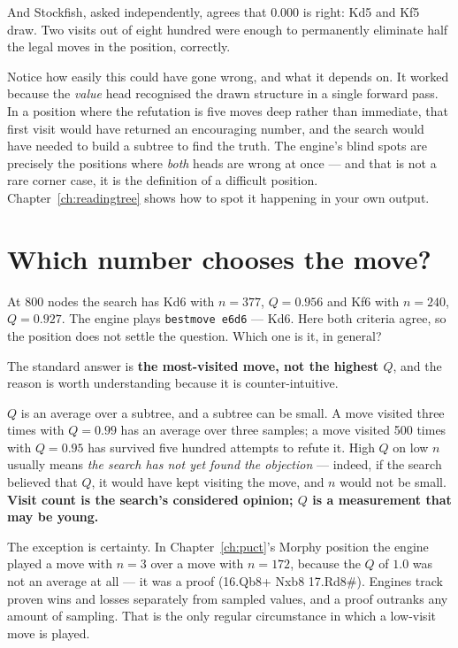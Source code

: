 And Stockfish, asked independently, agrees that $0.000$ is right: Kd5 and Kf5 draw. Two visits
out of eight hundred were enough to permanently eliminate half the legal moves in the
position, correctly.

\begin{pitfall}
Notice how easily this could have gone wrong, and what it depends on. It worked because the
\emph{value} head recognised the drawn structure in a single forward pass. In a position
where the refutation is five moves deep rather than immediate, that first visit would have
returned an encouraging number, and the search would have needed to build a subtree to find
the truth. The engine's blind spots are precisely the positions where \emph{both} heads are
wrong at once --- and that is not a rare corner case, it is the definition of a difficult
position. Chapter~\ref{ch:readingtree} shows how to spot it happening in your own output.
\end{pitfall}

\section{Which number chooses the move?}

At 800 nodes the search has Kd6 with $n=377$, $Q = 0.956$ and Kf6 with $n = 240$,
$Q = 0.927$. The engine plays \texttt{bestmove e6d6} --- Kd6. Here both criteria agree, so the
position does not settle the question. Which one is it, in general?

The standard answer is \textbf{the most-visited move, not the highest $Q$}, and the reason is
worth understanding because it is counter-intuitive.

\begin{keyidea}
$Q$ is an average over a subtree, and a subtree can be small. A move visited three times with
$Q = 0.99$ has an average over three samples; a move visited 500 times with $Q = 0.95$ has
survived five hundred attempts to refute it. High $Q$ on low $n$ usually means \emph{the
search has not yet found the objection} --- indeed, if the search believed that $Q$, it would
have kept visiting the move, and $n$ would not be small. \textbf{Visit count is the search's
considered opinion; $Q$ is a measurement that may be young.}
\end{keyidea}

The exception is certainty. In Chapter~\ref{ch:puct}'s Morphy position the engine played a
move with $n = 3$ over a move with $n = 172$, because the $Q$ of $1.0$ was not an average at
all --- it was a proof (16.Qb8+ Nxb8 17.Rd8\#). Engines track proven wins and losses
separately from sampled values, and a proof outranks any amount of sampling. That is the only
regular circumstance in which a low-visit move is played.

